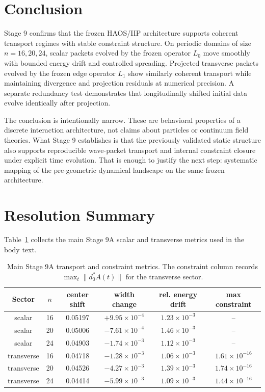 \documentclass[11pt]{article}
\begin{document}
\section{Conclusion}
Stage 9 confirms that the frozen HAOS/IIP architecture supports coherent transport regimes with stable constraint structure. On periodic domains of size $n=16,20,24$, scalar packets evolved by the frozen operator $L_0$ move smoothly with bounded energy drift and controlled spreading. Projected transverse packets evolved by the frozen edge operator $L_1$ show similarly coherent transport while maintaining divergence and projection residuals at numerical precision. A separate redundancy test demonstrates that longitudinally shifted initial data evolve identically after projection.

The conclusion is intentionally narrow. These are behavioral properties of a discrete interaction architecture, not claims about particles or continuum field theories. What Stage 9 establishes is that the previously validated static structure also supports reproducible wave-packet transport and internal constraint closure under explicit time evolution. That is enough to justify the next step: systematic mapping of the pre-geometric dynamical landscape on the same frozen architecture.

\appendix
\section{Resolution Summary}
Table~\ref{tab:resolution-summary} collects the main Stage 9A scalar and transverse metrics used in the body text.

\begin{table}[ht]
\centering
\begin{tabular}{cccccc}
\hline
Sector & $n$ & center shift & width change & rel. energy drift & max constraint \\
\hline
scalar & 16 & 0.05197 & $+9.95\times10^{-4}$ & $1.23\times10^{-3}$ & -- \\
scalar & 20 & 0.05006 & $-7.61\times10^{-4}$ & $1.46\times10^{-3}$ & -- \\
scalar & 24 & 0.04903 & $-1.74\times10^{-3}$ & $1.12\times10^{-3}$ & -- \\
transverse & 16 & 0.04718 & $-1.28\times10^{-3}$ & $1.06\times10^{-3}$ & $1.61\times10^{-16}$ \\
transverse & 20 & 0.04526 & $-4.27\times10^{-3}$ & $1.39\times10^{-3}$ & $1.74\times10^{-16}$ \\
transverse & 24 & 0.04414 & $-5.99\times10^{-3}$ & $1.09\times10^{-3}$ & $1.44\times10^{-16}$ \\
\hline
\end{tabular}
\caption{Main Stage 9A transport and constraint metrics. The constraint column records $\max_t\|d_0^{*}A(t)\|$ for the transverse sector.}
\label{tab:resolution-summary}
\end{table}
\end{document}
